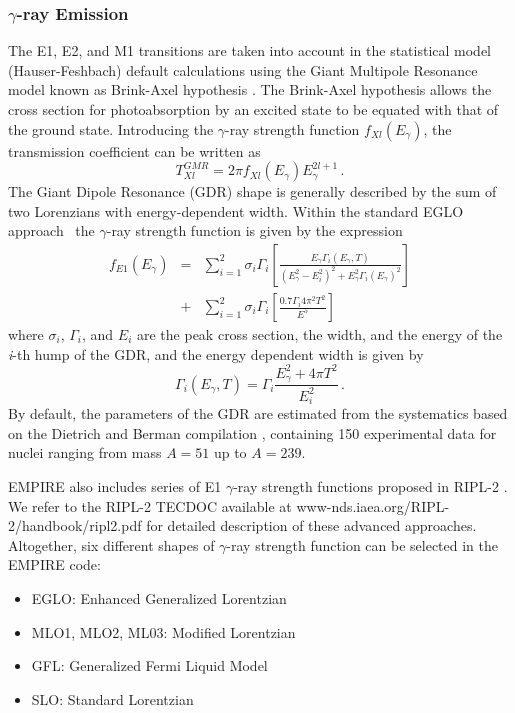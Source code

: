 \documentclass[twocolumn,amsmath,amssymb,10pt,groupedaddress,letter]{revtex4}
\begin{document}
\subsubsection{$\gamma$-ray Emission}
The E1, E2, and M1 transitions are taken into account in the statistical
model (Hauser-Feshbach) default calculations using
the Giant Multipole Resonance model known as Brink-Axel hypothesis \cite{Axel,Brink,Brinka}.
The Brink-Axel hypothesis allows the cross section for photoabsorption
by an excited state to be equated with that of the ground state. Introducing
the $\gamma$-ray strength function $f_{Xl}(E_{\gamma})$, the transmission
coefficient can be written as
\begin{equation}
T_{Xl}^{GMR}=2\pi f_{Xl}(E_{\gamma})E_{\gamma}^{2l+1}\,.
\label{tgGMR}
\end{equation}
The Giant Dipole Resonance (GDR) shape is generally described by the
sum of two Lorenzians with energy-dependent width. Within the standard
EGLO approach~\cite{kop01} the $\gamma$-ray
strength function is given by the expression
\noindent
\begin{eqnarray}
f_{E1}(E_{\gamma})&=&\sum_{i=1}^{2}\sigma_{i}\Gamma_{i}\left[\frac{E_{\gamma}\Gamma_{i}(E_{\gamma},T)}{(E_{\gamma}^{2}-E_{i}^{2})^{2}+E_{\gamma}^{2}\Gamma_{i}(E_{\gamma})^{2}}\right]\nonumber\\
&+&\sum_{i=1}^{2}\sigma_{i}\Gamma_{i}\left[\frac{0.7\Gamma_{i}4\pi^{2}T^{2}}{E^{5}}\right]
\label{lorenz}
\end{eqnarray}
\noindent where $\sigma_{i}$, $\Gamma_{i}$, and $E_{i}$ are the peak cross
section, the width, and the energy of the \emph{i}-th hump of the
GDR, and the energy dependent width is given by
\begin{equation}
\Gamma_{i}(E_{\gamma},T)=\Gamma_{i}\frac{E_{\gamma}^{2}+4\pi T^{2}}{E_{i}^{2}}\,.
\end{equation}
By default, the parameters of the GDR are estimated from the systematics
based on the Dietrich and Berman compilation \cite{die88}, containing
150 experimental data for nuclei ranging from mass $A=51$ up to $A=239$.

EMPIRE also includes series of E1 $\gamma$-ray strength functions
proposed in RIPL-2 \cite{RIPL2}. We refer to the RIPL-2 TECDOC available
at www-nds.iaea.org/RIPL-2/handbook/ripl2.pdf for detailed description
of these advanced approaches. Altogether, six different
shapes of $\gamma$-ray strength function can be selected in the EMPIRE code:
\begin{itemize}
\item  EGLO: Enhanced Generalized Lorentzian~\cite{kop01}
\item  MLO1, MLO2, ML03: Modified Lorentzian~\cite{plu01,plu02,plu03}
\item  GFL: Generalized Fermi Liquid Model~\cite{mug01}
\item  SLO: Standard Lorentzian~\cite{bri01}
\end{itemize}
\end{document}
